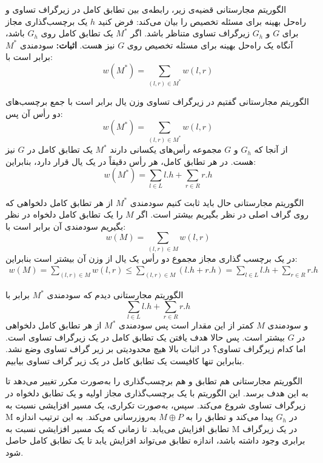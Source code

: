 \begin{itemframe}{الگوریتم مجارستانی}
\itm
قضیه‌ی زیر، رابطه‌ی بین تطابق کامل در زیرگراف تساوی و راه‌حل بهینه برای مسئله تخصیص را بیان می‌کند:
\itm
فرض کنید $h$ یک برچسب‌گذاری مجاز برای $G$ و $G_h$ زیرگراف تساوی متناظر باشد. اگر $M^*$ یک تطابق کامل روی $G_h$ باشد، آنگاه یک راه‌حل بهینه برای مسئله تخصیص روی $G$ نیز هست.
\itm
\textbf{اثبات:}
سودمندی $M^*$ برابر است با:
$$
w(M^\ast) = \sum_{(l, r) \in M^\ast} w(l, r)
$$

\end{itemframe}

\begin{itemframe}{الگوریتم مجارستانی}
\itm
گفتیم در زیرگراف تساوی وزن یال برابر است با جمع برچسب‌های دو رأس آن پس:
$$
w(M^\ast) = \sum_{(l, r) \in M^\ast} w(l, r)
$$
\itm
از آنجا که $G_h$ و $G$ مجموعه رأس‌های یکسانی دارند $M^\ast$ یک تطابق کامل در $G$ نیز هست. در هر تطابق کامل، هر رأس دقیقاً در یک یال قرار دارد، بنابراین:
$$
w(M^\ast) = \sum_{l \in L} l.h + \sum_{r \in R} r.h
$$
\end{itemframe}

\begin{itemframe}{الگوریتم مجارستانی}
\itm
حال باید ثابت کنیم سودمندی $M^\ast$ از هر تطابق کامل دلخواهی که روی گراف اصلی در نظر بگیریم بیشتر است. اگر $M$  را یک تطابق کامل دلخواه در نظر بگیریم سودمندی آن برابر است با:
$$
w(M) = \sum_{(l, r) \in M} w(l, r)
$$
\itm
در یک برچسب گذاری مجاز مجموع دو رأس یک یال از وزن آن بیشتر است بنابراین:
\begin{align*}
w(M) = \sum_{(l, r) \in M} w(l, r) \leq \sum_{(l, r) \in M} (l.h + r.h) = \sum_{l \in L} l.h + \sum_{r \in R} r.h
\end{align*}
\end{itemframe}

\begin{itemframe}{الگوریتم مجارستانی}
\itm
دیدم که سودمندی $M^\ast$ برابر با
$$
\sum_{l \in L} l.h + \sum_{r \in R} r.h
$$
و سودمندی $M$ کمتر از این مقدار است پس سودمندی $M^\ast$ از هر تطابق کامل دلخواهی در $G‌$ بیشتر است.
\itm
پس حالا هدف یافتن یک تطابق کامل در یک زیرگراف تساوی است. اما کدام زیرگراف تساوی؟ در اثبات بالا هیچ محدودیتی بر زیر گراف تساوی وضع نشد. بنابراین تنها کافیست یک تطابق کامل در یک زیر گراف تساوی بیابیم.

\itm
الگوریتم مجارستانی هم تطابق و هم برچسب‌گذاری را به‌صورت مکرر تغییر می‌دهد تا به این هدف برسد.
\itm
این الگوریتم با یک برچسب‌گذاری مجاز اولیه و یک تطابق دلخواه در زیرگراف تساوی شروع می‌کند. سپس، به‌صورت تکراری، یک مسیر افزایشی نسبت به  M در $G_h$ پیدا می‌کند و تطابق را به $M \oplus P$ به‌روزرسانی می‌کند. به این ترتیب اندازه تطابق افزایش می‌یابد.
\itm
تا زمانی که یک مسیر افزایشی نسبت به M در یک زیرگراف برابری وجود داشته باشد، اندازه تطابق می‌تواند افزایش یابد تا یک تطابق کامل حاصل شود.
\end{itemframe}

